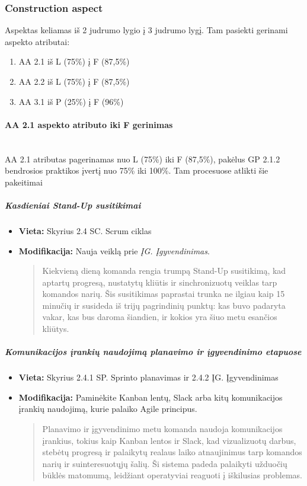 \documentclass{article}
\newcommand{\subsubsubsection}[1]{\paragraph{#1}\mbox{}\\}
\begin{document}
\subsubsection{Construction aspect}

Aspektas keliamas iš 2 judrumo lygio į 3 judrumo lygį. Tam pasiekti gerinami aspekto atributai:
\begin{enumerate}
\item AA 2.1 iš L (75\%) į F (87,5\%) 
\item AA 2.2 iš L (75\%) į F (87,5\%) 
\item AA 3.1 iš P (25\%) į F (96\%) 
\end{enumerate}

\subsubsubsection{AA 2.1 aspekto atributo iki F gerinimas}

AA 2.1 atributas pagerinamas nuo L (75\%) iki F (87,5\%), pakėlus GP 2.1.2 bendrosios praktikos įvertį nuo 75\% iki 100\%. Tam procesuose atlikti šie pakeitimai

\subparagraph{Kasdieniai Stand-Up susitikimai}
\begin{itemize}
    \item \textbf{Vieta:} Skyrius 2.4 SC. Scrum ciklas
    \item \textbf{Modifikacija:} Nauja veiklą prie \textit{ĮG. Įgyvendinimas}.
    \begin{quote}
   Kiekvieną dieną komanda rengia trumpą Stand-Up susitikimą, kad aptartų progresą, nustatytų kliūtis ir sinchronizuotų veiklas tarp komandos narių. Šis susitikimas paprastai trunka ne ilgiau kaip 15 minučių ir susideda iš trijų pagrindinių punktų: kas buvo padaryta vakar, kas bus daroma šiandien, ir kokios yra šiuo metu esančios kliūtys.
    \end{quote}
\end{itemize}


\subparagraph{Komunikacijos įrankių naudojimą planavimo ir įgyvendinimo etapuose}
\begin{itemize}
    \item \textbf{Vieta:} Skyrius 2.4.1 SP. Sprinto planavimas ir 2.4.2 ĮG. Įgyvendinimas
    \item \textbf{Modifikacija:} Paminėkite Kanban lentų, Slack arba kitų komunikacijos įrankių naudojimą, kurie palaiko Agile principus. 
    \begin{quote}
    Planavimo ir įgyvendinimo metu komanda naudoja komunikacijos įrankius, tokius kaip Kanban lentos ir Slack, kad vizualizuotų darbus, stebėtų progresą ir palaikytų realaus laiko atnaujinimus tarp komandos narių ir suinteresuotųjų šalių. Ši sistema padeda palaikyti užduočių būklės matomumą, leidžiant operatyviai reaguoti į iškilusias problemas.
    \end{quote}
\end{itemize}
\end{document}
